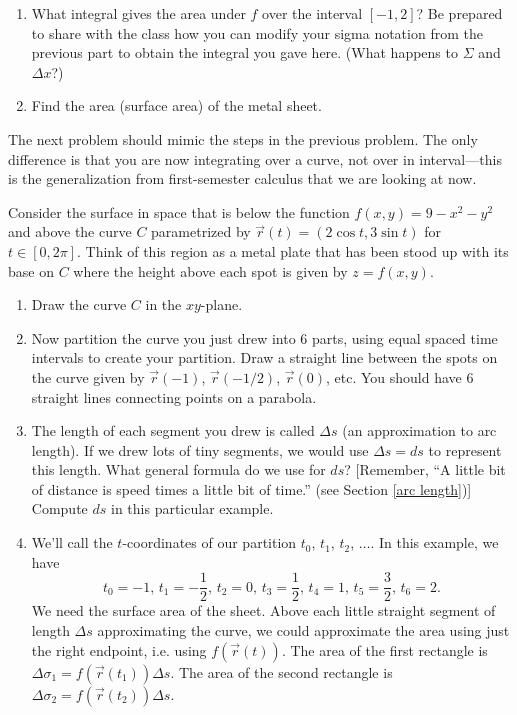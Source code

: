 \begin{problem}
\begin{enumerate}
\item What integral gives the area under $f$ over the interval $[-1,2]$? Be prepared to share with the class how you can modify your sigma notation from the previous part to obtain the integral you gave here. (What happens to $\Sigma$ and $\Delta x$?)
\item Find the area (surface area) of the metal sheet.
\end{enumerate}

\end{problem}

The next problem should mimic the steps in the previous problem.  The only difference is that you are now integrating over a curve, not over in interval---this is the generalization from first-semester calculus that we are looking at now.

\begin{problem}%
%
 Consider the surface in space that is below the function 
$f(x,y)=9-x^2-y^2$ and above the curve $C$ parametrized by 
$\vec r(t)=(2\cos t, 3\sin t)$ for $t\in[0,2\pi]$.  Think of this region as a metal plate that has been stood up with its base on $C$ where the height above each spot is given by $z=f(x,y)$.
\begin{enumerate}
 \item Draw the curve $C$ in the $xy$-plane. 
 \item Now partition the curve you just drew into 6 parts, using equal spaced time intervals to create your partition. Draw a straight line between the spots on the curve given by $\vec r(-1)$, $\vec r(-1/2)$, $\vec r(0)$, etc.  You should have 6 straight lines connecting points on a parabola.
 \item The length of each segment you drew is called $\Delta s$ (an approximation to arc length). If we drew lots of tiny segments, we would use $\Delta s=ds$ to represent this length.  What general formula do we use for $ds$? [Remember, ``A little bit of distance is speed times a little bit of time.'' (see Section \ref{arc length})] Compute $ds$ in this particular example.
 \item We'll call the $t$-coordinates of our partition $t_0$, $t_1$, $t_2$, $\ldots$. In this example, we have 
$$
t_0=-1, \,
t_1=-\frac{1}{2},  \,
t_2=0,  \,
t_3=\frac{1}{2},  \,
t_4=1,  \,
t_5=\frac{3}{2},  \,
t_6=2.
$$
We need the surface area of the sheet. Above each little straight segment of length $\Delta s$ approximating the curve, we could approximate the area using just the right endpoint, i.e. using $f(\vec r(t))$.  The area of the first rectangle is   $\Delta \sigma_1=f(\vec r(t_1))\Delta s$. The area of the second rectangle is $\Delta \sigma_2=f(\vec r(t_2))\Delta s$.  


\end{enumerate}
\end{problem}
